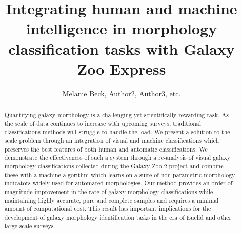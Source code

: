 \documentclass[twocolumn]{aastex6}
\begin{document}
\title{Integrating human and machine intelligence in morphology classification tasks with Galaxy Zoo Express}


\author{Melanie Beck, Author2, Author3, etc.}



\begin{abstract}


Quantifying galaxy morphology is a challenging yet scientifically rewarding task. As the scale of data continues to increase with upcoming surveys, traditional classifications methods will struggle to handle the load. We present a solution to the scale problem through an integration of visual and machine classifications which preserves the best features of both human and automatic classifications. We demonstrate the effectiveness of such a system through a 
re-analysis of visual galaxy morphology classifications collected during the Galaxy Zoo 2
project and combine these with a machine algorithm which learns on a suite of non-parametric 
morphology indicators widely used for automated morphologies. Our method 
provides an order of magnitude improvement in the rate of galaxy morphology 
classifications while maintaining highly accurate, pure and complete samples and  
requires a minimal amount of computational cost. 
This result has important implications for the development of galaxy morphology identification tasks in the era of Euclid and other large-scale surveys. 


\end{abstract}
\end{document}
